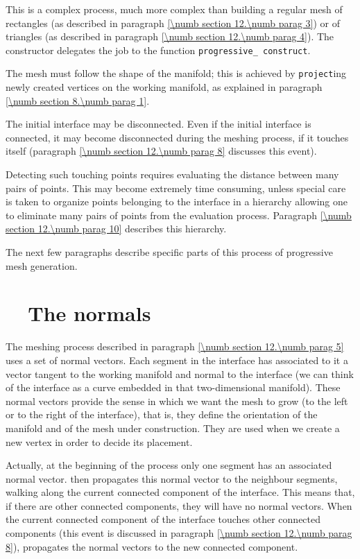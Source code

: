 This is a complex process, much more complex than building a regular mesh of rectangles
(as described in paragraph \ref{\numb section 12.\numb parag 3}) or of triangles (as described
in paragraph \ref{\numb section 12.\numb parag 4}).
The constructor delegates the job to the function {\small\tt progressive\_\,construct}.

The mesh must follow the shape of the manifold; this is achieved by {\small\tt project}ing
newly created vertices on the working manifold, as explained in paragraph
\ref{\numb section 8.\numb parag 1}.

The initial interface may be disconnected.
Even if the initial interface is connected, it may become disconnected during the meshing
process, if it touches itself (paragraph \ref{\numb section 12.\numb parag 8}
discusses this event).

Detecting such touching points requires evaluating the distance between many pairs of points.
This may become extremely time consuming, unless special care is taken to organize points
belonging to the interface in a hierarchy allowing one to eliminate many pairs of points
from the evaluation process.
Paragraph \ref{\numb section 12.\numb parag 10} describes this hierarchy.

The next few paragraphs describe specific parts of this process of progressive mesh generation.


\section{~~The normals}\label{\numb section 12.\numb parag 6}

The meshing process described in paragraph \ref{\numb section 12.\numb parag 5} uses a set of
normal vectors.
Each segment in the interface has associated to it
a vector tangent to the working manifold and normal to the interface (we can
think of the interface as a curve embedded in that two-dimensional manifold).
These normal vectors provide the sense in which we want the mesh to grow (to the left or to
the right of the interface), that is, they define the orientation of the manifold and of
the mesh under construction.
They are used when we create a new vertex in order to decide its placement.

Actually, at the beginning of the process only one segment has an associated normal vector.
{\ManiFEM} then propagates this normal vector to the neighbour segments, walking along
the current connected component of the interface.
This means that, if there are other connected components, they will have no normal vectors.
When the current connected component of the interface touches other connected components
(this event is discussed in paragraph \ref{\numb section 12.\numb parag 8}), {\maniFEM}
propagates the normal vectors to the new connected component.


